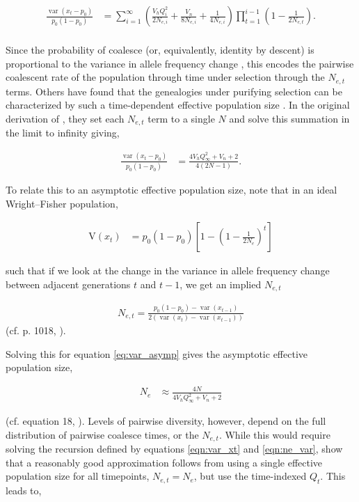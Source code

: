 \documentclass[11pt]{article}
\newcommand{\V}{\text{V}}
\DeclareMathOperator{\var}{var}
\begin{document}
\begin{align}
  \label{eqn:var_xt}
  \frac{\var(x_t - p_0)}{p_0(1-p_0)} &= \sum_{i=1}^\infty \left(\frac{V_h Q_i^2}{2 N_{e,i}} + \frac{V_n}{8N_{e,i}} + \frac{1}{4N_{e,i}} \right)\prod_{t=1}^{i-1} \left(1-\frac{1}{2 N_{e,t}}\right). \\
\end{align}

Since the probability of coalesce (or, equivalently, identity by descent) is
proportional to the variance in allele frequency change
\parencite{Barton2000-zg}, this encodes the pairwise coalescent rate of the
population through time under selection through the $N_{e,t}$ terms. Others
have found that the genealogies under purifying selection can be characterized
by such a time-dependent effective population size
\parencite{Nicolaisen2013-gv}. In the original derivation of
\textcite{Santiago1995-hx}, they set each $N_{e,t}$ term to a single $N$ and
solve this summation in the limit to infinity giving,

\begin{align}
  \label{eq:var_asymp}
  \frac{\var(x_t - p_0)}{p_0(1-p_0)} &= \frac{4 V_h Q_\infty^2 +V_n+2}{4 (2 N-1)}.
\end{align}

To relate this to an asymptotic effective population size, note that in an
ideal Wright--Fisher population,

\begin{align}
  \V(x_t) &= p_0(1-p_0) \left[1 - \left(1 - \frac{1}{2N_e}\right)^t \right]
\end{align}

such that if we look at the change in the variance in allele frequency change
between adjacent generations $t$ and $t-1$, we get an implied $N_{e,t}$

\begin{align}
  \label{eqn:ne_var}
  N_{e,t} = \frac{p_0(1-p_0) - \var(x_{t-1})}{2(\var(x_t) - \var(x_{t-1}))}
\end{align}
%
(cf. p. 1018, \cite{Santiago1995-hx}). 

Solving this for equation \eqref{eq:var_asymp} gives the asymptotic effective
population size,

\begin{align}
  N_e &\approx \frac{4N}{4 V_h Q_\infty^2 +V_n+2}
\end{align}

(cf. equation 18, \cite{Santiago1995-hx}). Levels of pairwise diversity,
however, depend on the full distribution of pairwise coalesce times, or the
$N_{e,t}$. While this would require solving the recursion defined by equations
\eqref{eqn:var_xt} and \eqref{eqn:ne_var}, \textcite{Santiago1998-bs} show that
a reasonably good approximation follows from using a single effective
population size for all timepoints, $N_{e,t} = N_e$, but use the time-indexed
$Q_t$. This leads to,
\end{document}
